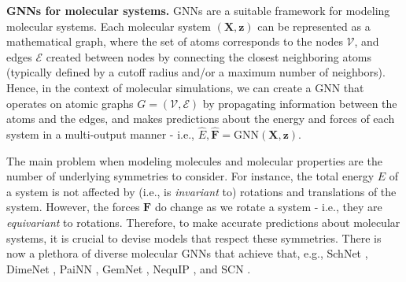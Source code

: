 \documentclass{article}
\newcommand{\GNN}{\text{GNN}}
\begin{document}
\textbf{GNNs for molecular systems.}
GNNs are a suitable framework for modeling molecular systems. Each molecular system $(\boldsymbol{X}, \boldsymbol{z})$ can be represented as a mathematical graph, where the set of atoms corresponds to the nodes $\mathcal{V}$, and edges $\mathcal{E}$ created between nodes by connecting the closest neighboring atoms (typically defined by a cutoff radius and/or a maximum number of neighbors). Hence, in the context of molecular simulations, we can create a GNN that operates on atomic graphs $G = (\mathcal{V}, \mathcal{E})$ by propagating information between the atoms and the edges, and makes predictions about the energy and forces of each system in a multi-output manner - i.e., $\hat{E}, \boldsymbol{\hat{F}} = \GNN(\boldsymbol{X}, \boldsymbol{z})$.

The main problem when modeling molecules and molecular properties are the number of underlying symmetries to consider.
For instance, the total energy $E$ of a system is not affected by (i.e., is \emph{invariant} to) rotations and translations of the system. However, the forces $\boldsymbol{F}$ do change as we rotate a system - i.e., they are \emph{equivariant} to rotations. Therefore, to make accurate predictions about molecular systems, it is crucial to devise models that respect these symmetries. There is now a plethora of diverse molecular GNNs that achieve that, e.g., SchNet \cite{schütt2017schnet}, DimeNet \cite{gasteiger_directional_2020, gasteiger_dimenetpp_2020}, PaiNN \cite{schutt_equivariant_2021}, GemNet \cite{gasteiger_gemnet_2021, gasteiger_gemnet_oc_2022}, NequIP \cite{batzner_e3-equivariant_2022}, and SCN \cite{zitnick2022spherical}.



 
\end{document}
